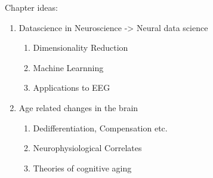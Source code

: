 Chapter ideas: 

\begin{enumerate}
	\item Datascience in Neuroscience -> Neural data science
	\begin{enumerate}
		\item Dimensionality Reduction
		\item Machine Learnning 
		\item Applications to EEG 
	\end{enumerate}
	\item Age related changes in the brain
	\begin{enumerate}
		\item Dedifferentiation, Compensation etc. 
		\item Neurophysiological Correlates 
		\item Theories of cognitive aging
	\end{enumerate} 
\end{enumerate}